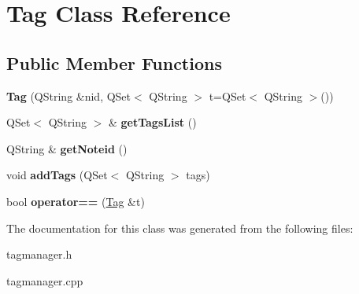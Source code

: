 \hypertarget{classTag}{\section{\-Tag \-Class \-Reference}
\label{classTag}
}
\subsection*{\-Public \-Member \-Functions}
\begin{DoxyCompactItemize}
\item 
\hypertarget{classTag_a4b8d9b57f817525b336be7f57c7d4cd0}{{\bfseries \-Tag} (\-Q\-String \&nid, \-Q\-Set$<$ \-Q\-String $>$ t=\-Q\-Set$<$ \-Q\-String $>$())}\label{classTag_a4b8d9b57f817525b336be7f57c7d4cd0}

\item 
\hypertarget{classTag_a1b690fb5385690f454c0283e76818f50}{\-Q\-Set$<$ \-Q\-String $>$ \& {\bfseries get\-Tags\-List} ()}\label{classTag_a1b690fb5385690f454c0283e76818f50}

\item 
\hypertarget{classTag_ad58a79c30b6f7be52bf92f380bf6e5ae}{\-Q\-String \& {\bfseries get\-Noteid} ()}\label{classTag_ad58a79c30b6f7be52bf92f380bf6e5ae}

\item 
\hypertarget{classTag_ac614cfc590e974d1c0fcfe4c80726beb}{void {\bfseries add\-Tags} (\-Q\-Set$<$ \-Q\-String $>$ tags)}\label{classTag_ac614cfc590e974d1c0fcfe4c80726beb}

\item 
\hypertarget{classTag_ab76b419440563072c75085788b45b508}{bool {\bfseries operator==} (\hyperlink{classTag}{\-Tag} \&t)}\label{classTag_ab76b419440563072c75085788b45b508}

\end{DoxyCompactItemize}


\-The documentation for this class was generated from the following files\-:\begin{DoxyCompactItemize}
\item 
tagmanager.\-h\item 
tagmanager.\-cpp\end{DoxyCompactItemize}
